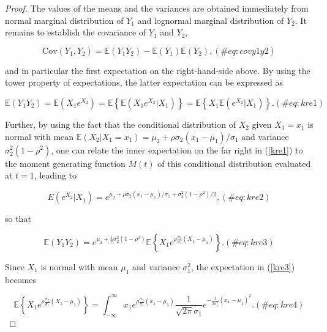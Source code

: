 \documentclass[
]{jss}
\begin{document}
\begin{proof}
The values of the means and the variances are obtained immediately from normal marginal distribution of $Y_1$ and lognormal marginal distribution of $Y_2$. It remains to establish the covariance of $Y_1$ and $Y_2$, 

\begin{equation}
\mbox{Cov}(Y_1, Y_2) = \mathbb E(Y_1 Y_2) - \mathbb E(Y_1)\mathbb E(Y_2), 
(\#eq:covy1y2)
\end{equation}

and in particular the first expectation on the right-hand-side above. By using the tower property of expectations, the latter expectation can be expressed as 

\begin{equation}
\mathbb E(Y_1 Y_2)  =  \mathbb E\left(X_1 e^{X_2}\right)  =  \mathbb E \left\{ \mathbb E \left(X_1 e^{X_2} | X_1 \right) \right\} = \mathbb E \left\{ X_1 \mathbb E \left(e^{X_2} | X_1 \right) \right\}.
(\#eq:kre1)
\end{equation}

Further, by using the fact that the conditional distribution of $X_2$ given $X_1=x_1$ is normal with mean $\mathbb E(X_2|X_1=x_1) = \mu_2+\rho\sigma_2(x_1-\mu_1)/\sigma_1$ and variance $\sigma_2^2(1-\rho^2)$, one can relate the inner expectation on the far right in (\ref{kre1}) to the moment generating function $M(t)$ of this conditional distribution evaluated at $t=1$, leading to 

\begin{equation}
E \left(e^{X_2} | X_1 \right) = e^{ \mu_2+\rho\sigma_2(x_1-\mu_1)/\sigma_1 + \sigma_2^2(1-\rho^2)/2},
(\#eq:kre2)
\end{equation}

so that 

\begin{equation}
\mathbb E(Y_1 Y_2)  =  e^{ \mu_2+ \frac{1}{2} \sigma_2^2(1-\rho^2)} \mathbb E \left\{ X_1 e^{ \rho\frac{\sigma_2}{\sigma_1} (X_1-\mu_1)} \right\}.
(\#eq:kre3)
\end{equation}

Since $X_1$ is normal with mean $\mu_1$ and variance $\sigma_1^2$, the expectation in (\ref{kre3}) becomes 

\begin{equation}
\mathbb E \left\{ X_1 e^{ \rho\frac{\sigma_2}{\sigma_1} (X_1-\mu_1)} \right\} = \int_{-\infty}^\infty x_1 e^{ \rho\frac{\sigma_2}{\sigma_1} (x_1-\mu_1)} \frac{1}{\sqrt{2\pi}\sigma_1} e^{-\frac{1}{2\sigma_1^2}(x_1-\mu_1)^2}.
(\#eq:kre4)
\end{equation}


\end{proof}
\end{document}
